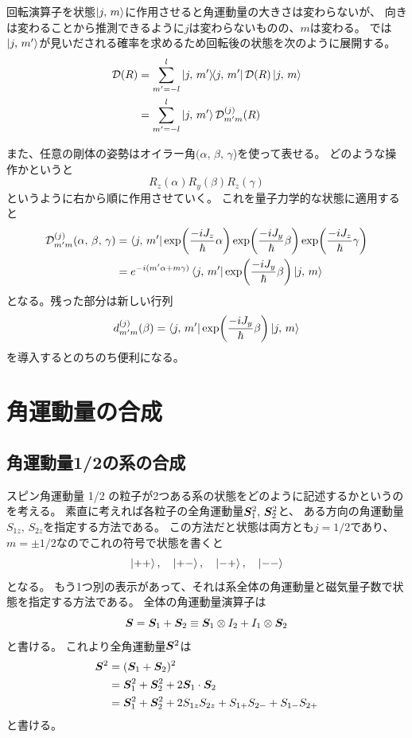 \documentclass[../master.tex]{subfiles}
\begin{document}
回転演算子を状態\(\ket{j,\, m}\)に作用させると角運動量の大きさは変わらないが、
向きは変わることから推測できるように\(j\)は変わらないものの、\(m\)は変わる。
では\(\ket{j,\,m'}\)が見いだされる確率を求めるため回転後の状態を次のように展開する。
\begin{align}
    \mathcal{D}(R) &= \sum_{m'=-l}^{l} \ketbra{j,\,m'} \mathcal{D}(R) \ket{j,\,m}\\
    &= \sum_{m'=-l}^{l} \ket{j,\,m'} \mathcal{D}_{m'm}^{(j)}(R)
\end{align}

また、任意の剛体の姿勢はオイラー角\((\alpha,\,\beta,\,\gamma\))を使って表せる。
どのような操作かというと
\begin{equation}
    R_z(\alpha)R_y(\beta)R_z(\gamma)
\end{equation}
というように右から順に作用させていく。
これを量子力学的な状態に適用すると
\begin{align}
    \mathcal{D}_{m'm}^{(j)}(\alpha,\,\beta,\,\gamma)
    &= \bra{j,\,m'}\exp(\frac{-iJ_z}{\hbar}\alpha)\exp(\frac{-iJ_y}{\hbar}\beta)\exp(\frac{-iJ_z}{\hbar}\gamma)\\
    &= e^{-i(m'\alpha+m\gamma)}\bra{j,\,m'}\exp(\frac{-iJ_y}{\hbar}\beta)\ket{j,\,m}
\end{align}
となる。残った部分は新しい行列
\begin{equation}
    d_{m'm}^{(j)}(\beta) = \bra{j,\,m'}\exp(\frac{-iJ_y}{\hbar}\beta)\ket{j,\,m}
\end{equation}
を導入するとのちのち便利になる。

\section{角運動量の合成}
\subsection{角運動量1/2の系の合成}
スピン角運動量 1/2 の粒子が2つある系の状態をどのように記述するかというのを考える。
素直に考えれば各粒子の全角運動量\(\vb*{S}_1^2,\,\vb*{S}_2^2\)と、
ある方向の角運動量\(S_{1z},\,S_{2z}\)を指定する方法である。
この方法だと状態は両方とも\(j=1/2\)であり、
\(m=\pm1/2\)なのでこれの符号で状態を書くと
\begin{equation}
    \ket{++},\quad\ket{+-},\quad\ket{-+},\quad\ket{--}
\end{equation}
となる。
もう1つ別の表示があって、それは系全体の角運動量と磁気量子数で状態を指定する方法である。
全体の角運動量演算子は
\begin{equation}
    \vb*{S} = \vb*{S}_1 + \vb*{S}_2 \equiv \vb*{S}_1 \otimes I_2 + I_1 \otimes \vb*{S}_2
\end{equation}
と書ける。
これより全角運動量\(\vb*{S}^2\)は
\begin{align}
    \vb*{S}^2
    &= (\vb*{S}_1+\vb*{S}_2)^2\\
    &= \vb*{S}_1^2 + \vb*{S}_2^2 + 2 \vb*{S}_1 \cdot \vb*{S}_2\\
    &= \vb*{S}_1^2 + \vb*{S}_2^2 + 2S_{1z}S_{2z} + S_{1+}S_{2-} + S_{1-}S_{2+}
\end{align}
と書ける。
\end{document}
